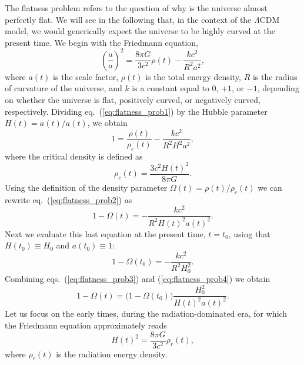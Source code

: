 The flatness problem refers to the question of why is the universe almost perfectly flat. We will see in the following that, in the context of the $\Lambda$CDM model, we would generically expect the universe to be highly curved at the present time. We begin with the Friedmann equation,
\begin{equation} \label{eq:flatness_prob1}
\left(\frac{\dot{a}}{a}\right)^2=\frac{8\pi G}{3c^2}\rho(t)-\frac{kc^2}{R^2a^2},
\end{equation}
where $a(t)$ is the scale factor, $\rho(t)$ is the total energy density, $R$ is the radius of curvature of the universe, and $k$ is a constant equal to $0$, $+1$, or $-1$, depending on whether the universe is flat, positively curved, or negatively curved, respectively. Dividing eq.\ (\ref{eq:flatness_prob1}) by the Hubble parameter $H(t)=\dot{a}(t)/a(t)$, we obtain
\begin{equation} \label{eq:flatness_prob2}
1=\frac{\rho(t)}{\rho_c(t)}-\frac{kc^2}{R^2H^2a^2},
\end{equation}
where the critical density is defined as
\begin{equation}
\rho_c(t)=\frac{3c^2H(t)^2}{8\pi G}.
\end{equation}
Using the definition of the density parameter $\Omega(t)=\rho(t)/\rho_c(t)$ we can rewrite eq.\ (\ref{eq:flatness_prob2}) as
\begin{equation} \label{eq:flatness_prob3}
1-\Omega(t)=-\frac{kc^2}{R^2H(t)^2a(t)^2}.
\end{equation}
Next we evaluate this last equation at the present time, $t=t_0$, using that $H(t_0)\equiv H_0$ and $a(t_0)\equiv1$:
\begin{equation} \label{eq:flatness_prob4}
1-\Omega(t_0)=-\frac{kc^2}{R^2H_0^2}.
\end{equation}
Combining eqs.\ (\ref{eq:flatness_prob3}) and (\ref{eq:flatness_prob4}) we obtain
\begin{equation} \label{eq:flatness_prob7}
1-\Omega(t)=\big(1-\Omega(t_0)\big)\frac{H_0^2}{H(t)^2a(t)^2}.
\end{equation}
Let us focus on the early times, during the radiation-dominated era, for which the Friedmann equation approximately reads
\begin{equation} \label{eq:flatness_prob5}
H(t)^2=\frac{8\pi G}{3c^2}\rho_r(t),
\end{equation}
where $\rho_r(t)$ is the radiation energy density.

\par\vspace{\baselineskip}

